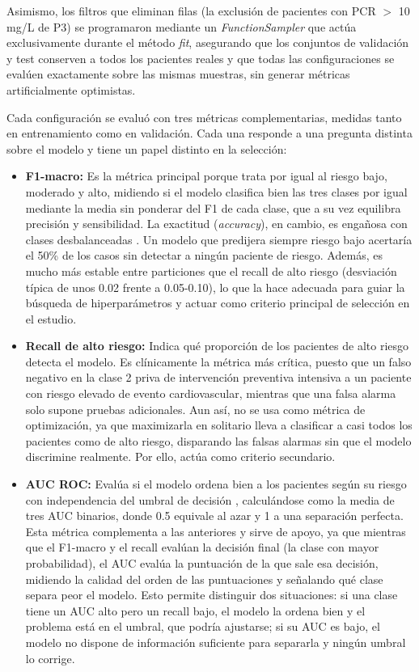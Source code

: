 \documentclass[journal,onecolumn]{IEEEtran}
\begin{document}
Asimismo, los filtros que eliminan filas (la exclusión de pacientes con PCR $>$ 10 mg/L de P3) se programaron mediante un \textit{FunctionSampler} que actúa exclusivamente durante el método \textit{fit}, asegurando que los conjuntos de validación y test conserven a todos los pacientes reales y que todas las configuraciones se evalúen exactamente sobre las mismas muestras, sin generar métricas artificialmente optimistas.

Cada configuración se evaluó con tres métricas complementarias, medidas tanto en entrenamiento como en validación. Cada una responde a una pregunta distinta sobre el modelo y tiene un papel distinto en la selección:

\begin{itemize}
    \item \textbf{F1-macro:} Es la métrica principal porque trata por igual al riesgo bajo, moderado y alto, midiendo si el modelo clasifica bien las tres clases por igual mediante la media sin ponderar del F1 de cada clase, que a su vez equilibra precisión y sensibilidad. La exactitud (\textit{accuracy}), en cambio, es engañosa con clases desbalanceadas \cite{sokolova2009metrics}. Un modelo que predijera siempre riesgo bajo acertaría el 50\% de los casos sin detectar a ningún paciente de riesgo. Además, es mucho más estable entre particiones que el recall de alto riesgo (desviación típica de unos 0.02 frente a 0.05-0.10), lo que la hace adecuada para guiar la búsqueda de hiperparámetros y actuar como criterio principal de selección en el estudio.

    \item \textbf{Recall de alto riesgo:} Indica qué proporción de los pacientes de alto riesgo detecta el modelo. Es clínicamente la métrica más crítica, puesto que un falso negativo en la clase 2 priva de intervención preventiva intensiva a un paciente con riesgo elevado de evento cardiovascular, mientras que una falsa alarma solo supone pruebas adicionales. Aun así, no se usa como métrica de optimización, ya que maximizarla en solitario lleva a clasificar a casi todos los pacientes como de alto riesgo, disparando las falsas alarmas sin que el modelo discrimine realmente. Por ello, actúa como criterio secundario.

    \item \textbf{AUC ROC:} Evalúa si el modelo ordena bien a los pacientes según su riesgo con independencia del umbral de decisión \cite{fawcett2006roc}, calculándose como la media de tres AUC binarios, donde 0.5 equivale al azar y 1 a una separación perfecta. Esta métrica complementa a las anteriores y sirve de apoyo, ya que mientras que el F1-macro y el recall evalúan la decisión final (la clase con mayor probabilidad), el AUC evalúa la puntuación de la que sale esa decisión, midiendo la calidad del orden de las puntuaciones y señalando qué clase separa peor el modelo. Esto permite distinguir dos situaciones: si una clase tiene un AUC alto pero un recall bajo, el modelo la ordena bien y el problema está en el umbral, que podría ajustarse; si su AUC es bajo, el modelo no dispone de información suficiente para separarla y ningún umbral lo corrige.
\end{itemize} 
\end{document}
